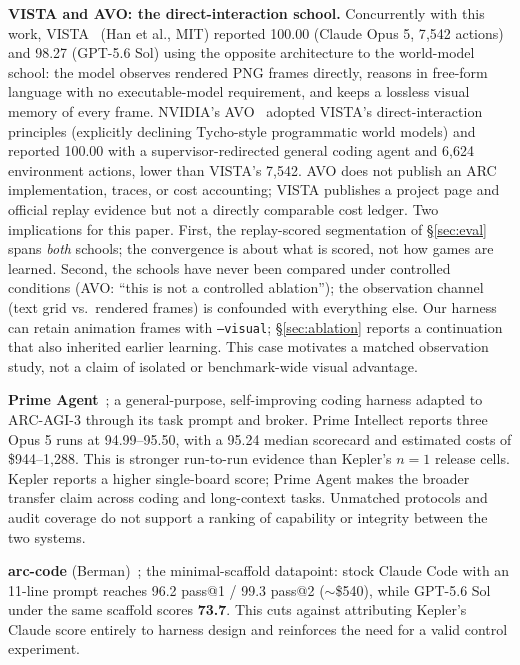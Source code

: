 \documentclass[11pt]{article}
\begin{document}
\textbf{VISTA and AVO: the direct-interaction school.} Concurrently with this
work, VISTA~\citep{vista} (Han et al., MIT) reported 100.00 (Claude Opus 5, 7{,}542 actions)
and 98.27 (GPT-5.6 Sol) using the opposite architecture to the world-model
school: the model observes rendered PNG frames directly, reasons in free-form
language with no executable-model requirement, and keeps a lossless visual
memory of every frame. NVIDIA's AVO~\citep{avo} adopted VISTA's direct-interaction
principles (explicitly declining Tycho-style programmatic world models) and
reported 100.00 with a supervisor-redirected general coding agent and 6{,}624
environment actions, lower than VISTA's 7{,}542. AVO does not publish an ARC
implementation, traces, or cost accounting; VISTA publishes a project page and
official replay evidence but not a directly comparable cost ledger. Two
implications for this paper. First, the replay-scored
segmentation of \S\ref{sec:eval} spans \emph{both} schools; the convergence
is about what is scored, not how games are learned. Second, the schools have
never been compared under controlled conditions (AVO: ``this is not a
controlled ablation''); the observation channel (text grid vs.\ rendered
frames) is confounded with everything else. Our harness can retain animation
frames with \texttt{--visual}; \S\ref{sec:ablation} reports a continuation that
also inherited earlier learning. This case motivates a matched observation
study, not a claim of isolated or benchmark-wide visual advantage.

\textbf{Prime Agent}~\citep{primeagent,primeagentreport}; a general-purpose, self-improving
coding harness adapted to ARC-AGI-3 through its task prompt and broker. Prime
Intellect reports three Opus 5 runs at 94.99--95.50, with a 95.24 median
scorecard and estimated costs of \$944--1,288. This is stronger run-to-run
evidence than Kepler's $n=1$ release cells. Kepler reports a higher single-board
score; Prime Agent makes the broader transfer claim across coding and
long-context tasks. Unmatched protocols and audit coverage do not support a
ranking of capability or integrity between the two systems.

\textbf{arc-code} (Berman)~\citep{arccode}; the minimal-scaffold datapoint: stock Claude Code with an 11-line prompt reaches 96.2 pass@1 / 99.3 pass@2 (${\sim}$\$540), while GPT-5.6 Sol under the same scaffold scores \textbf{73.7}. This cuts against attributing Kepler's Claude score entirely to harness design and reinforces the need for a valid control experiment.
\end{document}
